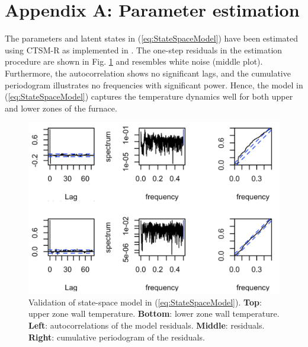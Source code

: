 \documentclass[conference]{IEEEtran}
\begin{document}
{\appendices


\vspace{1mm}
\section*{Appendix A: Parameter estimation}\label{app:parameter-estimation}
\vspace{-1mm}
The parameters and latent states in (\ref{eq:StateSpaceModel}) have been estimated using CTSM-R \cite{juhl2016ctsmr} as implemented in \cite{code}. The one-step residuals in the estimation procedure are shown in Fig. \ref{fig:4thOrderModelValidation} and resembles white noise (middle plot). Furthermore, the autocorrelation shows no significant lags, and the cumulative periodogram illustrates no frequencies with significant power. Hence, the model in (\ref{eq:StateSpaceModel}) captures the temperature dynamics well for both  upper and lower zones of the furnace.


\begin{figure}[t]
    \centering
    \includegraphics[width=\columnwidth]{../figures/4thOrderModelValidation_V2.png}
    \caption{\small{Validation of state-space model in (\ref{eq:StateSpaceModel}). \textbf{Top}: upper zone wall temperature. \textbf{Bottom}: lower zone wall temperature. \textbf{Left}: autocorrelations of the model residuals. \textbf{Middle}: residuals. \textbf{Right}: cumulative periodogram of the residuals. \vspace{-3mm}}}
    \label{fig:4thOrderModelValidation}
\end{figure}

}
\end{document}
